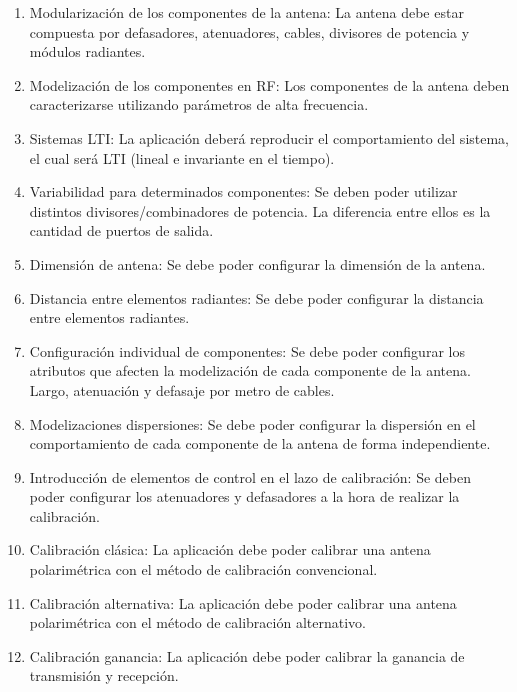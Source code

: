 \begin{enumerate}
    \item Modularización de los componentes de la antena: La antena debe estar compuesta por defasadores, atenuadores, cables, 
		divisores de potencia y módulos radiantes.
    
	\item Modelización de los componentes en RF: Los componentes de la antena deben caracterizarse utilizando parámetros de alta 
		frecuencia.

    \item Sistemas LTI: La aplicación deberá reproducir el comportamiento del sistema, el cual será LTI (lineal e invariante 
		en el tiempo).
    
    \item Variabilidad para determinados componentes: Se deben poder utilizar distintos divisores/combinadores de potencia. 
		La diferencia entre ellos es la cantidad de puertos de salida.
    
    \item Dimensión de antena: Se debe poder configurar la dimensión de la antena.
    \item Distancia entre elementos radiantes: Se debe poder configurar la distancia entre elementos radiantes.
    \item Configuración individual de componentes: Se debe poder configurar los atributos que afecten la modelización de cada 
		componente de la antena. Largo, atenuación y defasaje por metro de cables. 
    
    \item Modelizaciones dispersiones: Se debe poder configurar la dispersión en el comportamiento de cada componente de la 
		antena de forma independiente.

    \item Introducción de elementos de control en el lazo de calibración: Se deben poder configurar los atenuadores y 
		defasadores a la hora de realizar la calibración. 

    \item Calibración clásica: La aplicación debe poder calibrar una antena polarimétrica con el método de calibración convencional.
    
    \item Calibración alternativa: La aplicación debe poder calibrar una antena polarimétrica con el método de calibración alternativo.
    
    \item Calibración ganancia: La aplicación debe poder calibrar la ganancia de transmisión y recepción.
    

\end{enumerate}
